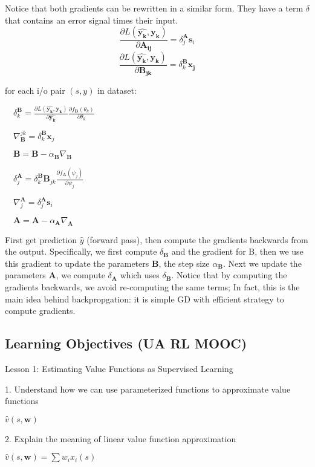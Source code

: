 \documentclass[sutton_barto_notes.tex]{subfiles}
\begin{document}
Notice that both gradients can be rewritten in a similar form. They have a term $\delta$ that contains an error signal times their input.
$$\frac{\partial L(\hat{\bm{y_k}}, \bm{y_k})}{\partial \bm{A_{ij}}} = \delta_j^{\bm{A}}\bm{s}_i$$
$$\frac{\partial L(\hat{\bm{y_k}}, \bm{y_k})}{\partial \bm{B_{jk}}} = \delta_k^{\bm{B}}\bm{x_j}$$

\begin{tcolorbox}[width=1.1\textwidth,title={one-hidden layer backprop algorithm}]
for each i/o pair $(s,y)$ in dataset:

$\quad\delta_k^{\bm{B}} = \frac{\partial L(\hat{\bm{y_k}}, \bm{y_k})}{\partial \hat{\bm{y_k}}}\frac{\partial f_{\bm{B}}(\theta_k)}{\partial\theta_k}$

$\quad\nabla_{\bm{B}}^{jk}=\delta_k^{\bm{B}}\bm{x}_j$

$\quad\bm{B} = \bm{B} - \alpha_{\bm{B}}\nabla_{\bm{B}}$

$\quad\delta_j^{\bm{A}} = \delta_k^{\bm{B}}\bm{B}_{jk} \frac{\partial f_{\bm{A}}(\psi_j) }{\partial \psi_j}$

$\quad\nabla_j^{\bm{A}} = \delta_j^{\bm{A}}\bm{s}_i$

$\quad\bm{A} = \bm{A} - \alpha_{\bm{A}}\nabla_{\bm{A}}$
\end{tcolorbox}
First get prediction $\hat{y}$ (forward pass), then compute the gradients backwards from the output. Specifically, we first compute $\delta_{\bm{B}}$ and the gradient for B, then we use this gradient to update the parameters $\bm{B}$, the step size $\alpha_{\bm{B}}$. Next we update the parameters $\bm{A}$, we compute $\delta_{\bm{A}}$ which uses $\delta_{\bm{B}}$. Notice that by computing the gradients backwards, we avoid re-computing the same terms; In fact, this is the main idea behind backpropgation: it is simple GD with efficient strategy to compute gradients.

\subsection{Learning Objectives (UA RL MOOC)}

Lesson 1: Estimating Value Functions as Supervised Learning 

1. Understand how we can use parameterized functions to approximate value functions 

$\hat{v}(s, \bm{w})$

2. Explain the meaning of linear value function approximation 

$\hat{v}(s, \bm{w}) = \sum w_i x_i(s)$
\end{document}
